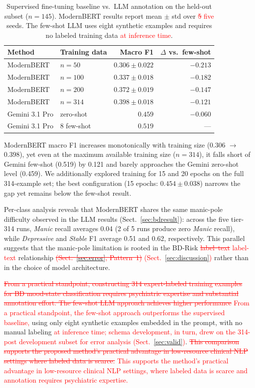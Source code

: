 \documentclass[runningheads]{llncs}
\newcommand{\rev}[1]{\textcolor{red}{#1}}
\newcommand{\del}[1]{\textcolor{red}{\sout{#1}}}
\newcommand{\rev}[1]{#1}
\newcommand{\del}[1]{}
\begin{document}
\begin{table}[t]
\caption{Supervised fine-tuning baseline vs.~LLM annotation on the held-out subset ($n = 145$). ModernBERT results report mean $\pm$ std over \del{5} \rev{five} seeds. The few-shot LLM uses eight synthetic examples and requires no labeled training data \rev{at inference time}.}
\label{tab:bert-baseline}
\centering
\setlength{\tabcolsep}{7pt}
\begin{tabular}{llrr}
\toprule
\textbf{Method} & \textbf{Training data} & \textbf{Macro F1} & \textbf{$\Delta$ vs.~few-shot} \\
\midrule
ModernBERT & $n = 50$ & $0.306 \pm 0.022$ & $-0.213$ \\
ModernBERT & $n = 100$ & $0.337 \pm 0.018$ & $-0.182$ \\
ModernBERT & $n = 200$ & $0.372 \pm 0.019$ & $-0.147$ \\
ModernBERT & $n = 314$ & $0.398 \pm 0.018$ & $-0.121$ \\
\midrule
Gemini 3.1 Pro & zero-shot & $0.459$ & $-0.060$ \\
Gemini 3.1 Pro & 8 few-shot & $\mathbf{0.519}$ & --- \\
\bottomrule
\end{tabular}
\end{table}

ModernBERT macro F1 increases monotonically with training size (0.306 $\rightarrow$ 0.398), yet even at the maximum available training size ($n = 314$), it falls short of Gemini few-shot (0.519) by 0.121 and barely approaches the Gemini zero-shot level (0.459). We additionally explored training for 15 and 20 epochs on the full 314-example set; the best configuration (15 epochs: $0.454 \pm 0.038$) narrows the gap yet remains below the few-shot result.

Per-class analysis reveals that ModernBERT shares the same manic-pole difficulty observed in the LLM results (Sect.~\ref{sec:bdresult}): across the five tier-314 runs, \emph{Manic} recall averages 0.04 (2 of 5 runs produce zero \emph{Manic} recall), while \emph{Depressive} and \emph{Stable} F1 average 0.51 and 0.62, respectively. This parallel suggests that the manic-pole limitation is rooted in the BD-Risk \del{label--text} \rev{label-text} relationship \del{(Sect.~\ref{sec:error}, Pattern~1)} \rev{(Sect.~\ref{sec:discussion})} rather than in the choice of model architecture.

\del{From a practical standpoint, constructing 314 expert-labeled training examples for BD mood-state classification requires psychiatric expertise and substantial annotation effort. The few-shot LLM approach achieves higher performance} \rev{From a practical standpoint, the few-shot approach outperforms the supervised baseline,} using only eight synthetic examples embedded in the prompt, with no manual labeling \rev{at inference time; schema development, in turn, drew on the 314-post development subset for error analysis (Sect.~\ref{sec:valid})}. \del{This comparison supports the proposed method's practical advantage in low-resource clinical NLP settings where labeled data is scarce.} \rev{This supports the method's practical advantage in low-resource clinical NLP settings, where labeled data is scarce and annotation requires psychiatric expertise.}
\end{document}
